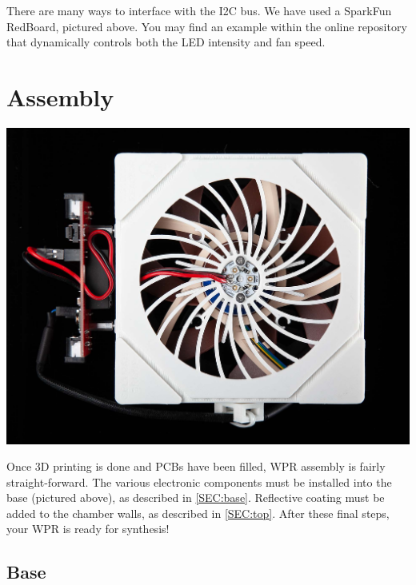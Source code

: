 \documentclass[11pt]{article}
\let\stdsection\section
\renewcommand\section{\clearpage\stdsection}
\begin{document}
There are many ways to interface with the I2C bus.
We have used a SparkFun RedBoard, pictured above.
You may find an example within the online repository that dynamically controls both the LED intensity and fan speed.



\section{Assembly} \label{SEC:assembly}

\includegraphics[width=\textwidth]{"./assembly-coverart.jpg"}

Once 3D printing is done and PCBs have been filled, WPR assembly is fairly straight-forward.
The various electronic components must be installed into the base (pictured above), as described in \autoref{SEC:base}.
Reflective coating must be added to the chamber walls, as described in \autoref{SEC:top}.
After these final steps, your WPR is ready for synthesis!

\clearpage
\subsection{Base} \label{SEC:base}
\end{document}
